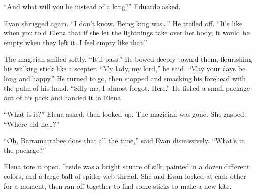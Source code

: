 \documentclass[10pt]{book}
\begin{document}
``And what will you be instead of a king?'' Eduardo asked.

Evan shrugged again. ``I don't know. Being king was{\ldots}'' He trailed off. ``It's like when you told Elena that if she let the lightnings take over her body, it would be empty when they left it. I feel empty like that.''

The magician smiled softly. ``It'll pass.'' He bowed deeply toward them, flourishing his walking stick like a scepter. ``My lady, my lord,'' he said. ``May your days be long and happy.'' He turned to go, then stopped and smacking his forehead with the palm of his hand. ``Silly me, I almost forgot. Here.'' He fished a small package out of his pack and handed it to Elena.

``What is it?'' Elena asked, then looked up. The magician was gone. She gasped. ``Where did he{\ldots}?''

``Oh, Barramarrabee does that all the time,'' said Evan dismissively. ``What's in the package?''

Elena tore it open. Inside was a bright square of silk, painted in a dozen different colors, and a large ball of spider web thread. She and Evan looked at each other for a moment, then ran off together to find some sticks to make a new kite.


\end{document}
